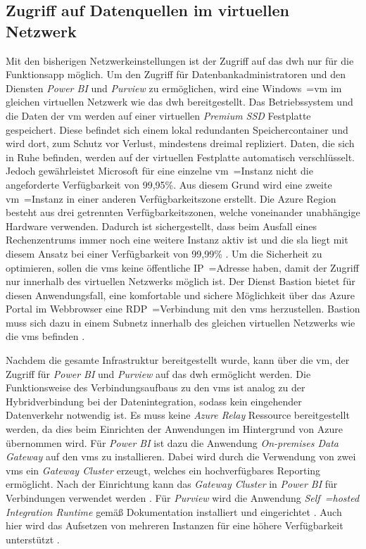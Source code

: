 \subsection{Zugriff auf Datenquellen im virtuellen Netzwerk} \label{subsec:infra:konfig:vm}
Mit den bisherigen Netzwerkeinstellungen ist der Zugriff auf das \ac{dwh} nur für die Funktionsapp möglich. Um den Zugriff für Datenbankadministratoren und den Diensten \textit{Power BI} und \textit{Purview} zu ermöglichen, wird eine Windows~=\ac{vm} im gleichen virtuellen Netzwerk wie das \ac{dwh} bereitgestellt. Das Betriebssystem und die Daten der \ac{vm} werden auf einer virtuellen \textit{Premium SSD} Festplatte gespeichert. Diese befindet sich einem lokal redundanten Speichercontainer und wird dort, zum Schutz vor Verlust, mindestens dreimal repliziert. Daten, die sich in Ruhe befinden, werden auf der virtuellen Festplatte automatisch verschlüsselt. Jedoch gewährleistet Microsoft für eine einzelne \ac{vm}~=Instanz nicht die angeforderte Verfügbarkeit von 99,95\%. Aus diesem Grund wird eine zweite \ac{vm}~=Instanz in einer anderen Verfügbarkeitszone erstellt. Die Azure Region besteht aus drei getrennten Verfügbarkeitszonen, welche voneinander unabhängige Hardware verwenden. Dadurch ist sichergestellt, dass beim Ausfall eines Rechenzentrums immer noch eine weitere Instanz aktiv ist und die \ac{sla} liegt mit diesem Ansatz bei einer Verfügbarkeit von 99,99\% \cite[vgl.][]{soh_data_2020}. Um die Sicherheit zu optimieren, sollen die \acp{vm} keine öffentliche IP~=Adresse haben, damit der Zugriff nur innerhalb des virtuellen Netzwerks möglich ist. Der Dienst Bastion bietet für diesen Anwendungsfall, eine komfortable und sichere Möglichkeit über das Azure Portal im Webbrowser eine RDP~=Verbindung mit den \acp{vm} herzustellen. Bastion muss sich dazu in einem Subnetz innerhalb des gleichen virtuellen Netzwerks wie die \acp{vm} befinden \cite[vgl.][]{herath_azure_2022}.

Nachdem die gesamte Infrastruktur bereitgestellt wurde, kann über die \ac{vm}, der Zugriff für \textit{Power BI} und \textit{Purview} auf das \ac{dwh} ermöglicht werden. Die Funktionsweise des Verbindungsaufbaus zu den \acp{vm} ist analog zu der Hybridverbindung bei der Datenintegration, sodass kein eingehender Datenverkehr notwendig ist. Es muss keine \textit{Azure Relay} Ressource bereitgestellt werden, da dies beim Einrichten der Anwendungen im Hintergrund von Azure übernommen wird. Für \textit{Power BI} ist dazu die Anwendung \textit{On-premises Data Gateway} auf den \acp{vm} zu installieren. Dabei wird durch die Verwendung von zwei \acp{vm} ein \textit{Gateway Cluster} erzeugt, welches ein hochverfügbares Reporting ermöglicht. Nach der Einrichtung kann das \textit{Gateway Cluster} in \textit{Power BI} für Verbindungen verwendet werden \cite[vgl.][]{gunnarsson_pro_2020}. Für \textit{Purview} wird die Anwendung \textit{Self~=hosted Integration Runtime} gemäß Dokumentation installiert und eingerichtet \cite[vgl.][]{msdoc_22_purviewSHIR}. Auch hier wird das Aufsetzen von mehreren Instanzen für eine höhere Verfügbarkeit unterstützt \cite{msdoc_22_purviewSHIRHighAv}.

